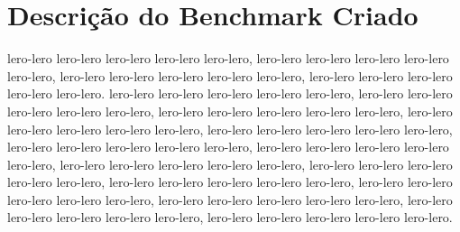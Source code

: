 \section{Descrição do Benchmark Criado} \label{sec:desc_bench}
	lero-lero lero-lero lero-lero lero-lero lero-lero, lero-lero lero-lero lero-lero lero-lero lero-lero, lero-lero lero-lero lero-lero lero-lero lero-lero, lero-lero lero-lero lero-lero lero-lero lero-lero. lero-lero lero-lero lero-lero lero-lero lero-lero, lero-lero lero-lero lero-lero lero-lero lero-lero, lero-lero lero-lero lero-lero lero-lero lero-lero, lero-lero lero-lero lero-lero lero-lero lero-lero, lero-lero lero-lero lero-lero lero-lero lero-lero, lero-lero lero-lero lero-lero lero-lero lero-lero, lero-lero lero-lero lero-lero lero-lero lero-lero, lero-lero lero-lero lero-lero lero-lero lero-lero, lero-lero lero-lero lero-lero lero-lero lero-lero, lero-lero lero-lero lero-lero lero-lero lero-lero, lero-lero lero-lero lero-lero lero-lero lero-lero, lero-lero lero-lero lero-lero lero-lero lero-lero, lero-lero lero-lero lero-lero lero-lero lero-lero, lero-lero lero-lero lero-lero lero-lero lero-lero.

